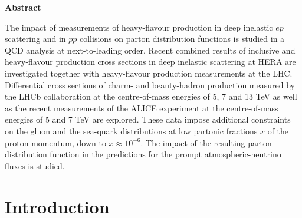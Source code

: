 \documentclass[12pt]{article}
\begin{document}
\begin{titlepage}
  \vspace{1.0cm}
\begin{center}
\large
{\bf Abstract}
\vspace{-0.2cm}
\end{center}
The impact of measurements of heavy-flavour production in deep inelastic $ep$ scattering and
in $pp$ collisions on parton distribution functions is studied in a QCD analysis at next-to-leading order. 
Recent combined results of inclusive and heavy-flavour production cross sections in deep inelastic scattering at HERA are 
investigated together with heavy-flavour production measurements at the LHC. Differential cross sections of charm- and 
beauty-hadron production measured by the LHCb collaboration at the centre-of-mass energies of 5, 7 and 13 TeV as well 
as the recent measurements of the ALICE experiment at the centre-of-mass energies of 5 and 7 TeV are explored. 
These data impose additional constraints on the gluon and the sea-quark distributions at low partonic fractions
$x$ of the proton momentum, down to $x\approx10^{-6}$. The impact of the resulting parton distribution function in the predictions for the prompt atmospheric-neutrino fluxes is studied.


\vfill
\end{titlepage}


%
%
\newpage

\section{Introduction}
\label{sect:intro}
\end{document}
